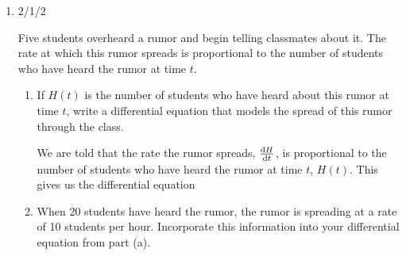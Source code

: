 \documentclass{article}
\begin{document}
\begin{enumerate}
\pspace{\newpage}

 




\item 

\begin{grading}
    2/1/2
\end{grading}

\begin{problem}
Five students overheard a rumor and begin telling classmates about it. The rate at which this rumor spreads is proportional to the number of students who have heard the rumor at time $t$.
\end{problem}
    
    \begin{enumerate}
        \item  
        \begin{problem}
        If $H(t)$ is the number of students who have heard about this rumor at time $t$, write a differential equation that models the spread of this rumor through the class.
        \end{problem}
        \pspace{\vfill}

        \begin{solution}
            We are told that the rate the rumor spreads, $\diff{H}{t}$, is proportional to the number of students who have heard the rumor at time $t$, $H(t)$. This gives us the differential equation 
        \end{solution}

        \item 
        \begin{problem}
        When 20 students have heard the rumor, the rumor is spreading at a rate of 10 students per hour. Incorporate this information into your differential equation from part (a).
        \end{problem}
        \pspace{\vfill}


\end{enumerate}
\end{enumerate}
\end{document}

